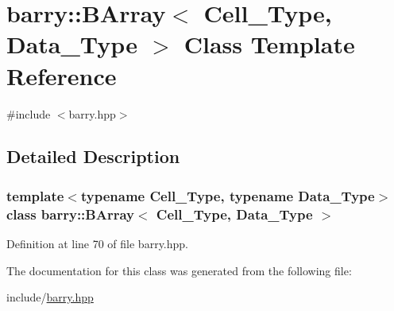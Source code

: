 \hypertarget{classbarry_1_1_b_array}{}\section{barry\+:\+:B\+Array$<$ Cell\+\_\+\+Type, Data\+\_\+\+Type $>$ Class Template Reference}
\label{classbarry_1_1_b_array}


{\ttfamily \#include $<$barry.\+hpp$>$}



\subsection{Detailed Description}
\subsubsection*{template$<$typename Cell\+\_\+\+Type, typename Data\+\_\+\+Type$>$\newline
class barry\+::\+B\+Array$<$ Cell\+\_\+\+Type, Data\+\_\+\+Type $>$}



Definition at line 70 of file barry.\+hpp.



The documentation for this class was generated from the following file\+:\begin{DoxyCompactItemize}
\item 
include/\hyperlink{barry_8hpp}{barry.\+hpp}\end{DoxyCompactItemize}
